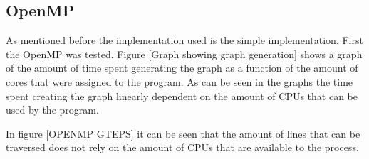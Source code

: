 \subsection{OpenMP}
As mentioned before the implementation used is the simple implementation. First the OpenMP was tested. Figure [Graph showing graph generation] shows a graph of the amount of time spent generating the graph as a function of the amount of cores that were assigned to the program. As can be seen in the graphs the time spent creating the graph linearly dependent on the amount of CPUs that can be used by the program. 

In figure [OPENMP GTEPS] it can be seen that the amount of lines that can be traversed does not rely on the amount of CPUs that are available to the process.

\subsection{}